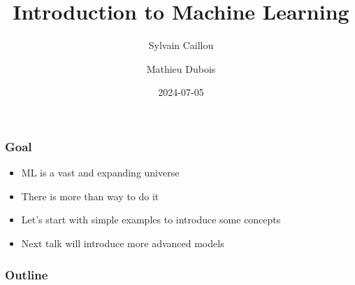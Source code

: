 \documentclass[10pt]{beamer}
\title{Introduction to Machine Learning}
\author{Sylvain Caillou \and Mathieu Dubois}
\institute{L2IT}
\date{2024-07-05}
\begin{document}
\frame{\titlepage}

\begin{frame}
  \frametitle{Goal}

  \begin{itemize}
  \item \ac{ML} is a vast and expanding universe
  \item There is more than way to do it
  \item Let's start with simple examples to introduce some concepts
  \item Next talk will introduce more advanced models
  \end{itemize}
\end{frame}

\begin{frame}
  \frametitle{Outline}
  \tableofcontents[hidesubsections]
\end{frame}






\end{document}
